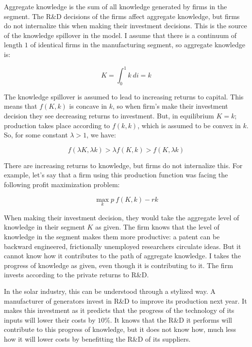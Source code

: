 \documentclass{article}
\begin{document}
Aggregate knowledge is the sum of all knowledge generated by firms in the segment. The R\&D decisions of the firms affect aggregate knowledge, but firms do not internalize this when making their investment decisions. This is the source of the knowledge spillover in the model. I assume that there is a continuum of length $1$ of identical firms in the manufacturing segment, so aggregate knowledge is:


\begin{equation}
K = \int_0^1 k ~ di = k
\end{equation}

 
The knowledge spillover is assumed to lead to increasing returns to capital. This means that $f(K,k)$ is concave in $k$, so when firm's make their investment decision they see decreasing returns to investment. But, in equilibrium $K=k$; production takes place according to $f(k,k)$, which is assumed to be convex in $k$. So, for some constant $\lambda>1$, we have:


\[
f(\lambda K, \lambda k) > \lambda f(K, k) > f(K, \lambda k) 
\]

There are increasing returns to knowledge, but firms do not internalize this. For example, let's say that a firm using this production function was facing the following profit maximization problem:

\[
\max_k p\:f(K,k) - rk
\]

When making their investment decision, they would take the aggregate level of knowledge in their segment $K$ as given. The firm knows that the level of knowledge in the segment makes them more productive: a patent can be backward engineered, frictionally unemployed researchers circulate ideas. But it cannot know how it contributes to the path of aggregate knowledge. I takes the progress of knowledge as given, even though it is contributing to it. The firm invests according to the private returns to R\&D. 

In the solar industry, this can be understood through a stylized way. A manufacturer of generators invest in R\&D to improve its production next year. It makes this investment as it predicts that the progress of the technology of its inputs will lower their costs by $10\%$. It knows that the R\&D it performs will contribute to this progress of knowledge, but it does not know how, much less how it will lower costs by benefitting the R\&D of its suppliers.
\end{document}
